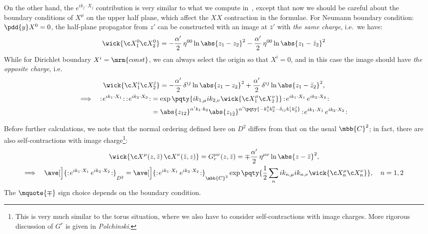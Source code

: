 \documentclass[a4paper,10pt]{article}
\begin{document}
\begin{enumerate}
\begin{enumerate}
	On the other hand, the $e^{ik_j\cdot X_j}$ contribution is very similar to what we compute in \,, except that now we should be careful about the boundary conditions of $X^\mu$ on the upper half plane, which affect the $XX$ contraction in the formulae. For Neumann boundary condition: $\pdd{y} X^0 = 0$, the half-plane propagator from $z'$ can be constructed with an image at $\bar{z}'$ with \textit{the same charge}, i.e.\ we have:
	\begin{equation}
		\wick{ \c X^0_1 \c X^0_2 }
		= - \frac{\alpha'}{2}\, \eta^{00}
				\ln \abs{z_1 - z_2}^2
			- \frac{\alpha'}{2}\, \eta^{00}
				\ln \abs{z_1 - \bar{z}_2}^2
	\end{equation}
	While for Dirichlet boundary $X^i = \mrm{const}$, we can always select the origin so that $X^i = 0$, and in this case the image should have \textit{the opposite charge}, i.e.
	\begin{gather}
		\wick{ \c X^i_1 \c X^j_2 }
		= - \frac{\alpha'}{2}\, \delta^{ij}
				\ln \abs{z_1 - z_2}^2
			+ \frac{\alpha'}{2}\, \delta^{ij}
				\ln \abs{z_1 - \bar{z}_2}^2,
	\\
	\begin{aligned}
		\Longrightarrow\quad
		\normorder{
			e^{ik_1\cdot X_1}
		}\,
		\normorder{
			e^{ik_2\cdot X_2}
		}
		&= \exp \pqty{
				ik_{1,\mu}
				ik_{2,\nu} 
				\wick{
					\c X^\mu_1
					\c X^\nu_2
				}
			}\, \normorder{
				e^{ik_1\cdot X_1}\,
				e^{ik_2\cdot X_2}
			} \\
		&= \abs{z_{12}}^{
				\alpha' k_1\cdot k_2
			}
			\abs{z_{1\bar{2}}}^{
				\alpha' \pqty{
					- k_1^0 k_2^0
					- \delta_{ij} k_1^i k_2^j
				}
			}\, \normorder{
				e^{ik_1\cdot X_1}\,
				e^{ik_2\cdot X_2}
			}
	\end{aligned}
	\end{gather}
	
	Before further calculations, we note that the normal ordering defined here on $D^2$ differs from that on the usual $\mbb{C}^2$; in fact, there are also self-contractions with image charge\footnote{
		This is very much similar to the torus situation, where we also have to consider self-contractions with image charges. More rigorous discussion of $G^r$ is given in \textit{Polchinski}. 
	}:
	\begin{gather}
		\wick{ \c X^\mu(z,\bar{z})\, \c X^\nu(\bar{z},z) }
		= G^{\mu\nu}_r(z,\bar{z})
		= \mp \frac{\alpha'}{2}\, \eta^{\mu\nu}
				\ln \abs{z - \bar{z}}^2,
	\\
		\Longrightarrow\quad
		\ave[\Big]{\normorder{
				e^{ik_1\cdot X_1}\,
				e^{ik_2\cdot X_2}
			}}_{D^2}
		= \ave[\Big]{\normorder{
				e^{ik_1\cdot X_1}\,
				e^{ik_2\cdot X_2}
			}}_{\mbb{C}^2} 
			\exp \pqty{
				\frac{1}{2} \sum_n
				ik_{n,\mu}
				ik_{n,\nu} 
				\wick{
					\c X^\mu_n
					\c X^\nu_n
				}
			},\quad n = 1,2
	\end{gather}
	The $\mquote{\mp}$ sign choice depends on the boundary condition. 
	

\end{enumerate}
\end{enumerate}
\end{document}
